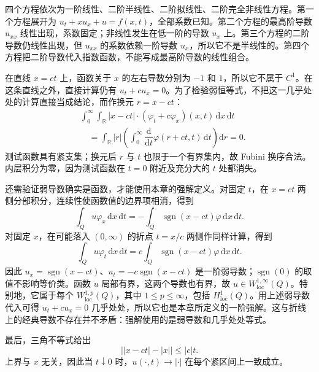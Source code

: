 \begin{solution}
四个方程依次为一阶线性、二阶半线性、二阶拟线性、二阶完全非线性方程。第一个方程展开为 \(u_t+xu_x+u=f(x,t)\)，全部系数已知。第二个方程的最高阶导数 \(u_{xx}\) 线性出现，系数固定；非线性发生在低一阶的导数 \(u_x\) 上。第三个方程的二阶导数仍线性出现，但 \(u_{xx}\) 的系数依赖一阶导数 \(u_x\)，所以它不是半线性的。第四个方程把二阶导数代入指数函数，不能写成最高阶导数的线性组合。

在直线 \(x=ct\) 上，函数关于 \(x\) 的左右导数分别为 \(-1\) 和 \(1\)，所以它不属于 \(C^1\)。在这条直线之外，直接计算仍有 \(u_t+c u_x=0\)。为了检验弱恒等式，不把这一几乎处处的计算直接当成结论，而作换元 \(r=x-ct\)：
\[
 \begin{split}
 &\int_0^\infty\int_{\mathbb R}|x-ct|\cdot
 (\varphi_t+c\varphi_x)(x,t)\,\mathrm dx\,\mathrm dt\\
 &\quad=\int_{\mathbb R}|r|\left(
 \int_0^\infty\dfrac{\mathrm d}{\mathrm dt}\varphi(r+ct,t)\,\mathrm dt
 \right)\mathrm dr=0.
 \end{split}
\]
测试函数具有紧支集；换元后 \(r\) 与 \(t\) 也限于一个有界集内，故 Fubini 换序合法。内层积分为零，因为测试函数在 \(t=0\) 附近及充分大的 \(t\) 处都消失。

还需验证弱导数确实是函数，才能使用本章的强解定义。对固定 \(t\)，在 \(x=ct\) 两侧分部积分，连续性使函数值的边界项相消，得到
\[
 \int_Q u\varphi_x\,\mathrm dx\,\mathrm dt
 =-\int_Q\operatorname{sgn}(x-ct)\varphi\,\mathrm dx\,\mathrm dt.
\]
对固定 \(x\)，在可能落入 \((0,\infty)\) 的折点 \(t=x/c\) 两侧作同样计算，得到
\[
 \int_Q u\varphi_t\,\mathrm dx\,\mathrm dt
 =c\int_Q\operatorname{sgn}(x-ct)\varphi\,\mathrm dx\,\mathrm dt.
\]
因此 \(u_x=\operatorname{sgn}(x-ct)\)、\(u_t=-c\operatorname{sgn}(x-ct)\) 是一阶弱导数；\(\operatorname{sgn}(0)\) 的取值不影响等价类。函数 \(u\) 局部有界，这两个导数也有界，故 \(u\in W^{1,\infty}_{\mathrm{loc}}(Q)\)。特别地，它属于每个 \(W^{1,p}_{\mathrm{loc}}(Q)\)，其中 \(1\leq p\leq\infty\)，包括 \(H^1_{\mathrm{loc}}(Q)\)。用上述弱导数代入可得 \(u_t+cu_x=0\) 几乎处处，所以它也是本章所定义的一阶强解。这与折线上的经典导数不存在并不矛盾：强解使用的是弱导数和几乎处处等式。

最后，三角不等式给出
\[
 \bigl||x-ct|-|x|\bigr|\leq|c|t.
\]
上界与 \(x\) 无关，因此当 \(t\downarrow0\) 时，\(u(\cdot,t)\to|\cdot|\) 在每个紧区间上一致成立。
\end{solution}


